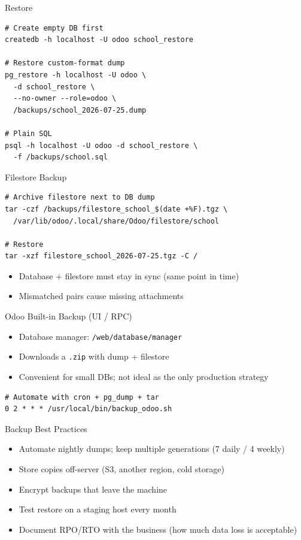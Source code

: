 \begin{frame}[fragile]{Restore}
\begin{lstlisting}[style=bash]
# Create empty DB first
createdb -h localhost -U odoo school_restore

# Restore custom-format dump
pg_restore -h localhost -U odoo \
  -d school_restore \
  --no-owner --role=odoo \
  /backups/school_2026-07-25.dump

# Plain SQL
psql -h localhost -U odoo -d school_restore \
  -f /backups/school.sql
\end{lstlisting}
\end{frame}

\begin{frame}[fragile]{Filestore Backup}
\begin{lstlisting}[style=bash]
# Archive filestore next to DB dump
tar -czf /backups/filestore_school_$(date +%F).tgz \
  /var/lib/odoo/.local/share/Odoo/filestore/school

# Restore
tar -xzf filestore_school_2026-07-25.tgz -C /
\end{lstlisting}

\vspace{0.4em}
\begin{itemize}
  \item Database + filestore must stay in sync (same point in time)
  \item Mismatched pairs cause missing attachments
\end{itemize}
\end{frame}

\begin{frame}[fragile]{Odoo Built-in Backup (UI / RPC)}
\begin{itemize}
  \item Database manager: \texttt{/web/database/manager}
  \item Downloads a \texttt{.zip} with dump + filestore
  \item Convenient for small DBs; not ideal as the only production strategy
\end{itemize}

\vspace{0.5em}
\begin{lstlisting}[style=bash]
# Automate with cron + pg_dump + tar
0 2 * * * /usr/local/bin/backup_odoo.sh
\end{lstlisting}
\end{frame}

\begin{frame}{Backup Best Practices}
\begin{itemize}
  \item Automate nightly dumps; keep multiple generations (7 daily / 4 weekly)
  \item Store copies off-server (S3, another region, cold storage)
  \item Encrypt backups that leave the machine
  \item Test restore on a staging host every month
  \item Document RPO/RTO with the business (how much data loss is acceptable)
\end{itemize}
\end{frame}
